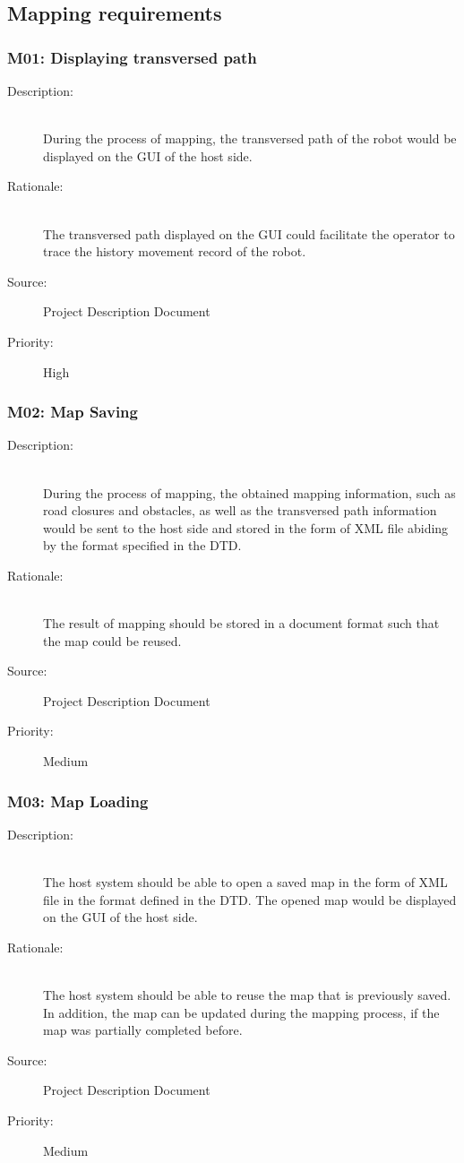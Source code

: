 \documentclass[titlepage]{article}
\begin{document}
\subsection{Mapping requirements} 
 \label{sec:Map}
\subsubsection{M01: Displaying transversed path }
\begin{description}
\item[Description: ] \hfill \\During the process of mapping, the transversed path of the robot would be displayed on the GUI of the host side.

\item[Rationale: ] \hfill \\The transversed path displayed on the GUI could facilitate the operator to trace the history movement record of the robot.
\item[Source: ] Project Description Document
\item[Priority: ] High
\end{description}

\subsubsection{M02: Map Saving }
\begin{description}
\item[Description: ] \hfill \\During the process of mapping, the obtained mapping information, such as road closures and obstacles, as well as the transversed path information would be sent to the host side and stored in the form of XML file abiding by the format specified in the DTD.
\item[Rationale: ] \hfill \\The result of mapping should be stored in a document format such that the map could be reused.
\item[Source: ] Project Description Document
\item[Priority: ] Medium
\end{description}


\subsubsection{M03: Map Loading }
\begin{description}
\item[Description: ] \hfill \\The host system should be able to open a saved map in the form of XML file in the format defined in the DTD. The opened map would be displayed on the GUI of the host side.
\item[Rationale: ] \hfill \\The host system should be able to reuse the map that is previously saved. In addition, the map can be updated during the mapping process, if the map was partially completed before.
\item[Source: ] Project Description Document
\item[Priority: ] Medium
\end{description}
\end{document}
